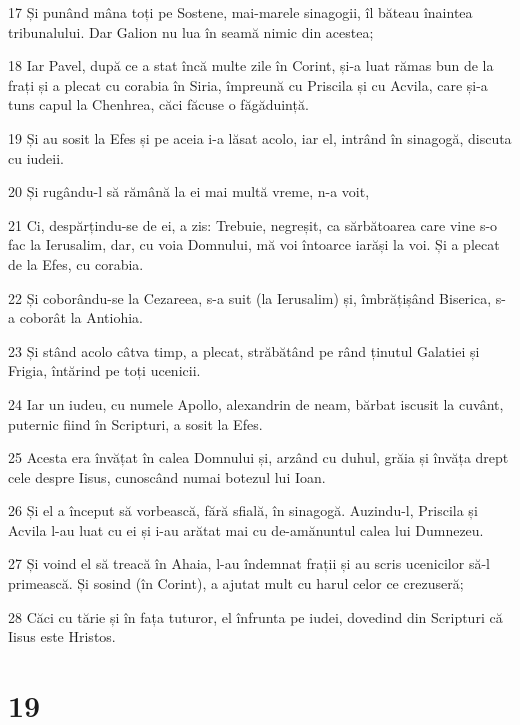 \par 17 Și punând mâna toți pe Sostene, mai-marele sinagogii, îl băteau înaintea tribunalului. Dar Galion nu lua în seamă nimic din acestea;
\par 18 Iar Pavel, după ce a stat încă multe zile în Corint, și-a luat rămas bun de la frați și a plecat cu corabia în Siria, împreună cu Priscila și cu Acvila, care și-a tuns capul la Chenhrea, căci făcuse o făgăduință.
\par 19 Și au sosit la Efes și pe aceia i-a lăsat acolo, iar el, intrând în sinagogă, discuta cu iudeii.
\par 20 Și rugându-l să rămână la ei mai multă vreme, n-a voit,
\par 21 Ci, despărțindu-se de ei, a zis: Trebuie, negreșit, ca sărbătoarea care vine s-o fac la Ierusalim, dar, cu voia Domnului, mă voi întoarce iarăși la voi. Și a plecat de la Efes, cu corabia.
\par 22 Și coborându-se la Cezareea, s-a suit (la Ierusalim) și, îmbrățișând Biserica, s-a coborât la Antiohia.
\par 23 Și stând acolo câtva timp, a plecat, străbătând pe rând ținutul Galatiei și Frigia, întărind pe toți ucenicii.
\par 24 Iar un iudeu, cu numele Apollo, alexandrin de neam, bărbat iscusit la cuvânt, puternic fiind în Scripturi, a sosit la Efes.
\par 25 Acesta era învățat în calea Domnului și, arzând cu duhul, grăia și învăța drept cele despre Iisus, cunoscând numai botezul lui Ioan.
\par 26 Și el a început să vorbească, fără sfială, în sinagogă. Auzindu-l, Priscila și Acvila l-au luat cu ei și i-au arătat mai cu de-amănuntul calea lui Dumnezeu.
\par 27 Și voind el să treacă în Ahaia, l-au îndemnat frații și au scris ucenicilor să-l primească. Și sosind (în Corint), a ajutat mult cu harul celor ce crezuseră;
\par 28 Căci cu tărie și în fața tuturor, el înfrunta pe iudei, dovedind din Scripturi că Iisus este Hristos.

\chapter{19}

